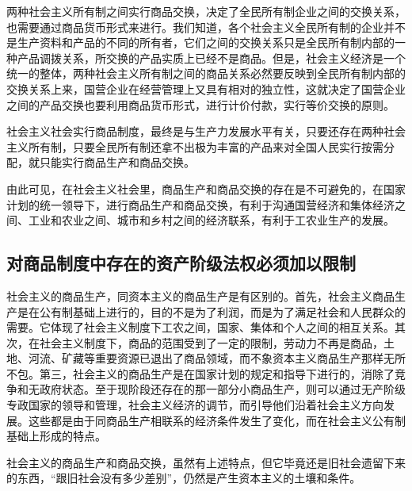 \documentclass{book}
\begin{document}
两种社会主义所有制之间实行商品交换，决定了全民所有制企业之间的交换关系，也需要通过商品货币形式来进行。我们知道，各个社会主义全民所有制的企业并不是生产资料和产品的不同的所有者，它们之间的交换关系只是全民所有制内部的一种产品调拨关系，所交换的产品实质上已经不是商品。但是，社会主义经济是一个统一的整体，两种社会主义所有制之间的商品关系必然要反映到全民所有制内部的交换关系上来，国营企业在经营管理上又具有相对的独立性，这就决定了国营企业之间的产品交换也要利用商品货币形式，进行计价付款，实行等价交换的原则。

社会主义社会实行商品制度，最终是与生产力发展水平有关，只要还存在两种社会主义所有制，只要全民所有制还拿不出极为丰富的产品来对全国人民实行按需分配，就只能实行商品生产和商品交换。

由此可见，在社会主义社会里，商品生产和商品交换的存在是不可避免的，在国家计划的统一领导下，进行商品生产和商品交换，有利于沟通国营经济和集体经济之间、工业和农业之间、城市和乡村之间的经济联系，有利于工农业生产的发展。

\subsection{对商品制度中存在的资产阶级法权必须加以限制}

社会主义的商品生产，同资本主义的商品生产是有区别的。首先，社会主义商品生产是在公有制基础上进行的，目的不是为了利润，而是为了满足社会和人民群众的需要。它体现了社会主义制度下工农之间，国家、集体和个人之间的相互关系。其次，在社会主义制度下，商品的范围受到了一定的限制，劳动力不再是商品，土地、河流、矿藏等重要资源已退出了商品领域，而不象资本主义商品生产那样无所不包。第三，社会主义的商品生产是在国家计划的规定和指导下进行的，消除了竞争和无政府状态。至于现阶段还存在的那一部分小商品生产，则可以通过无产阶级专政国家的领导和管理，社会主义经济的调节，而引导他们沿着社会主义方向发展。这些都是由于同商品生产相联系的经济条件发生了变化，而在社会主义公有制基础上形成的特点。

社会主义的商品生产和商品交换，虽然有上述特点，但它毕竟还是旧社会遗留下来的东西，“跟旧社会没有多少差别”，仍然是产生资本主义的土壤和条件。
\end{document}
